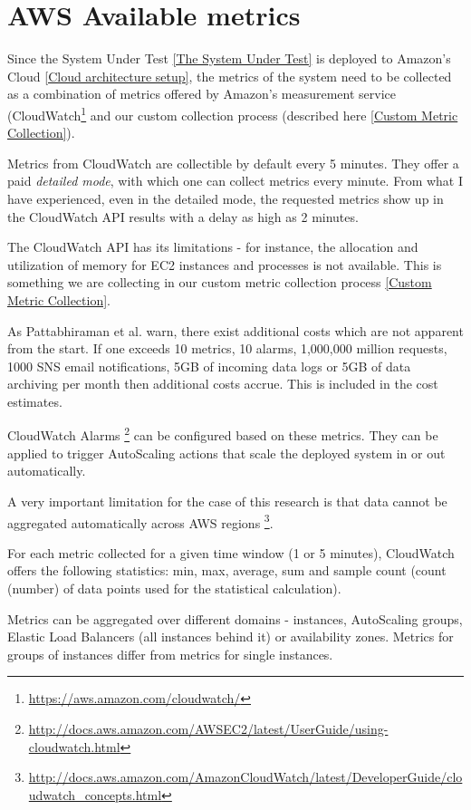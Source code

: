 \documentclass{uvamscse}
\begin{document}
\section{AWS Available metrics} \label{AWS Available metrics}

Since the System Under Test \ref{The System Under Test} is deployed to Amazon's Cloud \ref{Cloud architecture setup}, the metrics of the system need to be collected as a combination of metrics offered by Amazon's measurement service (CloudWatch\footnote{\url{https://aws.amazon.com/cloudwatch/}} and our custom collection process (described here \ref{Custom Metric Collection}).

Metrics from CloudWatch are collectible by default every 5 minutes. They offer a paid \textit{detailed mode}, with which one can collect metrics every minute. From what I have experienced, even in the detailed mode, the requested metrics show up in the CloudWatch API results with a delay as high as 2 minutes.

The CloudWatch API has its limitations - for instance, the allocation and utilization of memory for EC2 instances and processes is not available. This is something we are collecting in our custom metric collection process \ref{Custom Metric Collection}.

As Pattabhiraman et al. \cite{Models} warn, there exist additional costs which are not apparent from the start.
If one exceeds 10 metrics, 10 alarms, 1,000,000 million requests, 1000 SNS email notifications, 5GB of incoming data logs or 5GB of data archiving per month then additional costs accrue. This is included in the cost estimates.

CloudWatch Alarms \footnote{\url{http://docs.aws.amazon.com/AWSEC2/latest/UserGuide/using-cloudwatch.html}} can be configured based on these metrics. They can be applied to trigger AutoScaling actions that scale the deployed system in or out automatically.

A very important limitation for the case of this research is that data cannot be aggregated automatically across AWS regions \footnote{\url{http://docs.aws.amazon.com/AmazonCloudWatch/latest/DeveloperGuide/cloudwatch_concepts.html}}.

For each metric collected for a given time window (1 or 5 minutes), CloudWatch offers the following statistics: min, max, average, sum and sample count (count (number) of data points used for the statistical calculation).

Metrics can be aggregated over different domains - instances, AutoScaling groups, Elastic Load Balancers (all instances behind it) or availability zones. Metrics for groups of instances differ from metrics for single instances.
\end{document}
